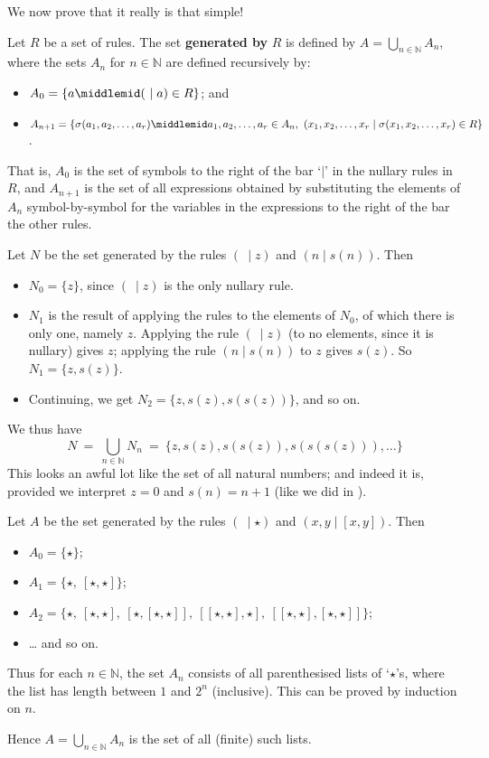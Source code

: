 We now prove that it really is that simple!

\begin{definition}
\label{defSetGeneratedByRules}
Let $R$ be a set of rules. The set \textbf{generated by} $R$ is defined by $A = \bigcup_{n \in \mathbb{N}} A_n$, where the sets $A_n$ for $n \in \mathbb{N}$ are defined recursively by:
\begin{itemize}
\item $A_0 = \left\{ a \middlemid (~\mid a) \in R \right\}$; and
\item $A_{n+1} = \left\{ \sigma(a_1,a_2,\dots,a_r) \middlemid a_1,a_2,\dots,a_r \in A_n, ~ (x_1,x_2,\dots,x_r \mid \sigma(x_1,x_2,\dots,x_r) \in R \right\}$.
\end{itemize}
That is, $A_0$ is the set of symbols to the right of the bar `$\mid$' in the nullary rules in $R$, and $A_{n+1}$ is the set of all expressions obtained by substituting the elements of $A_n$ symbol-by-symbol for the variables in the expressions to the right of the bar the other rules.
\end{definition}

\begin{example}
Let $N$ be the set generated by the rules $(~ \mid z)$ and $(n \mid s(n))$. Then
\begin{itemize}
\item $N_0 = \{ z \}$, since $(~ \mid z)$ is the only nullary rule.
\item $N_1$ is the result of applying the rules to the elements of $N_0$, of which there is only one, namely $z$. Applying the rule $(~\mid z)$ (to no elements, since it is nullary) gives $z$; applying the rule $(n \mid s(n))$ to $z$ gives $s(z)$. So $N_1 = \{ z, s(z) \}$.
\item Continuing, we get $N_2 = \{ z, s(z), s(s(z)) \}$, and so on.
\end{itemize}
We thus have
\[ N ~=~ \bigcup_{n \in \mathbb{N}} N_n ~=~ \{ z, s(z), s(s(z)), s(s(s(z))), \dots \} \]
This looks an awful lot like the set of all natural numbers; and indeed it is, provided we interpret $z=0$ and $s(n)=n+1$ (like we did in ).
\end{example}

\begin{example}
\label{exParenthesisations}
Let $A$ be the set generated by the rules $(~ \mid \star)$ and $(x,y \mid [x,y])$. Then
\begin{itemize}
\item $A_0 = \{ \star \}$;
\item $A_1 = \{ \star,~ [\star, \star] \}$;
\item $A_2 = \{ \star,~ [\star, \star],~ [\star, [\star,\star]],~ [[\star, \star], \star],~ [[\star,\star],[\star,\star]] \}$;
\item \dots{} and so on.
\end{itemize}
Thus for each $n \in \mathbb{N}$, the set $A_n$ consists of all parenthesised lists of `$\star$'s, where the list has length between $1$ and $2^n$ (inclusive). This can be proved by induction on $n$.

Hence $A = \bigcup_{n \in \mathbb{N}} A_n$ is the set of all (finite) such lists.
\end{example}

